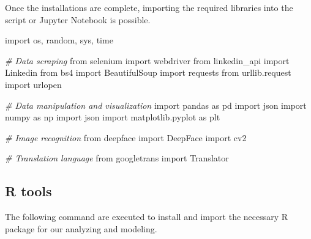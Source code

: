 \documentclass[11pt,]{article}
\newenvironment{Shaded}{\begin{snugshade}}{\end{snugshade}}
\newcommand{\CommentTok}[1]{\textcolor[rgb]{0.56,0.35,0.01}{\textit{#1}}}
\newcommand{\ImportTok}[1]{#1}
\newcommand{\NormalTok}[1]{#1}
\begin{document}
Once the installations are complete, importing the required libraries
into the script or Jupyter Notebook is possible.

\begin{Shaded}
\begin{Highlighting}[]
\ImportTok{import}\NormalTok{ os, random, sys, time }

\CommentTok{\# Data scraping}
\ImportTok{from}\NormalTok{ selenium }\ImportTok{import}\NormalTok{ webdriver}
\ImportTok{from}\NormalTok{ linkedin\_api }\ImportTok{import}\NormalTok{ Linkedin}
\ImportTok{from}\NormalTok{ bs4 }\ImportTok{import}\NormalTok{ BeautifulSoup}
\ImportTok{import}\NormalTok{ requests}
\ImportTok{from}\NormalTok{ urllib.request }\ImportTok{import}\NormalTok{ urlopen}

\CommentTok{\# Data manipulation and visualization}
\ImportTok{import}\NormalTok{ pandas }\ImportTok{as}\NormalTok{ pd}
\ImportTok{import}\NormalTok{ json}
\ImportTok{import}\NormalTok{ numpy }\ImportTok{as}\NormalTok{ np}
\ImportTok{import}\NormalTok{ json}
\ImportTok{import}\NormalTok{ matplotlib.pyplot }\ImportTok{as}\NormalTok{ plt}

\CommentTok{\# Image recognition}
\ImportTok{from}\NormalTok{ deepface }\ImportTok{import}\NormalTok{ DeepFace}
\ImportTok{import}\NormalTok{ cv2}

\CommentTok{\# Translation language}
\ImportTok{from}\NormalTok{ googletrans }\ImportTok{import}\NormalTok{ Translator}
\end{Highlighting}
\end{Shaded}

\hypertarget{r-tools}{%
\subsection{R tools}\label{r-tools}}

The following command are executed to install and import the necessary R
package for our analyzing and modeling.
\end{document}
